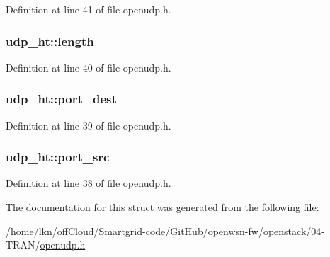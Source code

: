 Definition at line 41 of file openudp.\+h.

\subsubsection[{\texorpdfstring{length}{length}}]{ udp\+\_\+ht\+::length}\hypertarget{structudp__ht_a5c8de54e3590abf0847e75d70bee6c54}{}\label{structudp__ht_a5c8de54e3590abf0847e75d70bee6c54}


Definition at line 40 of file openudp.\+h.

\subsubsection[{\texorpdfstring{port\+\_\+dest}{port_dest}}]{ udp\+\_\+ht\+::port\+\_\+dest}\hypertarget{structudp__ht_ab48fdc2cf04ca5a87eaa43dfa96e9458}{}\label{structudp__ht_ab48fdc2cf04ca5a87eaa43dfa96e9458}


Definition at line 39 of file openudp.\+h.

\subsubsection[{\texorpdfstring{port\+\_\+src}{port_src}}]{ udp\+\_\+ht\+::port\+\_\+src}\hypertarget{structudp__ht_a6b915a906282e762b94c548196a450f3}{}\label{structudp__ht_a6b915a906282e762b94c548196a450f3}


Definition at line 38 of file openudp.\+h.



The documentation for this struct was generated from the following file\+:\begin{DoxyCompactItemize}
\item 
/home/lkn/off\+Cloud/\+Smartgrid-\/code/\+Git\+Hub/openwsn-\/fw/openstack/04-\/\+T\+R\+A\+N/\hyperlink{openudp_8h}{openudp.\+h}\end{DoxyCompactItemize}
